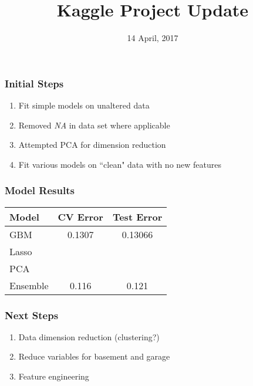\documentclass[xcolor=dvipsnames]{beamer}
\title[Machine Learning]{Kaggle Project Update}
\author[Stat 602]{}
\date{14 April, 2017}
\begin{document}
\begin{frame}
\titlepage
\end{frame}

\begin{frame}\frametitle{Initial Steps}

\begin{enumerate}
\item Fit simple models on unaltered data
\item Removed \emph{NA} in data set where applicable
\item Attempted PCA for dimension reduction
\item Fit various models on ``clean" data with no new features
\end{enumerate}

\end{frame}

\begin{frame}\frametitle{Model Results}

\begin{center}
\begin{tabular}{l c c}
	\hline
	Model & CV Error & Test Error \\
	\hline
	GBM & 0.1307 & 0.13066 \\
	Lasso & & \\
	PCA & & \\
	Ensemble & 0.116 & 0.121 \\
	\hline
\end{tabular}
\end{center}
\end{frame}

\begin{frame}\frametitle{Next Steps}

\begin{enumerate}
\item Data dimension reduction (clustering?)
\item Reduce variables for basement and garage
\item Feature engineering
\end{enumerate}

\end{frame}
\end{document}
